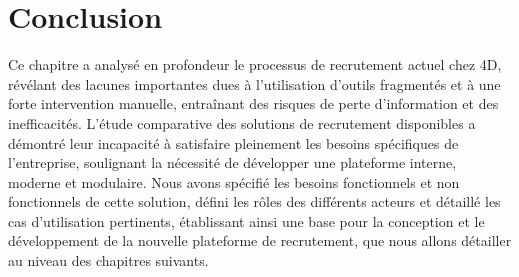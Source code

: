 

\section{Conclusion}
Ce chapitre a analysé en profondeur le processus de recrutement 
actuel chez 4D, révélant des lacunes importantes dues à 
l'utilisation d'outils fragmentés et à une forte intervention 
manuelle, entraînant des risques de perte d'information et des 
inefficacités. L'étude comparative des solutions de recrutement 
disponibles a démontré leur incapacité à satisfaire pleinement 
les besoins spécifiques de l'entreprise, soulignant la nécessité 
de développer une plateforme interne, moderne et modulaire. 
Nous avons spécifié les besoins fonctionnels et non fonctionnels 
de cette solution, défini les rôles des différents acteurs et 
détaillé les cas d'utilisation pertinents, établissant ainsi 
une base pour la conception et le développement de la 
nouvelle plateforme de recrutement, que nous allons détailler 
au niveau des chapitres suivants.